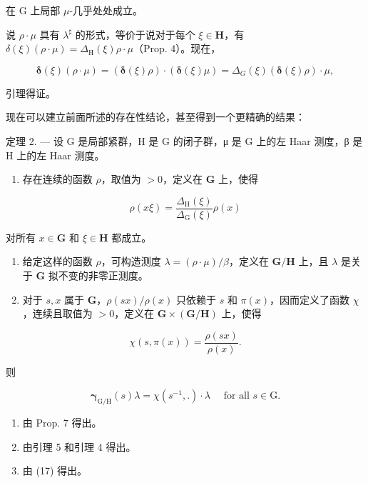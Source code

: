 在 G 上局部 \(\mu\)-几乎处处成立。

说 \(\rho \cdot \mu\) 具有 \(\lambda^{\sharp}\) 的形式，等价于说对于每个 \(\xi \in \mathbf{H}\)，有 \(\delta(\xi)(\rho \cdot \mu) = \Delta_{\mathrm{H}}(\xi)\rho \cdot \mu\)（Prop. 4）。现在，

\[
\boldsymbol {\delta} (\xi) (\rho \cdot \mu) = (\boldsymbol {\delta} (\xi) \rho) \cdot (\boldsymbol {\delta} (\xi) \mu) = \Delta_ {G} (\xi) (\boldsymbol {\delta} (\xi) \rho) \cdot \mu ,
\]

引理得证。

现在可以建立前面所述的存在性结论，甚至得到一个更精确的结果：

定理 2. --- 设 G 是局部紧群，H 是 G 的闭子群，μ 是 G 上的左 Haar 测度，β 是 H 上的左 Haar 测度。

\begin{enumerate}
\def\labelenumi{\alph{enumi})}
\tightlist
\item
  存在连续的函数 \(\rho\)，取值为 \(>0\)，定义在 \(\mathbf{G}\) 上，使得
\end{enumerate}

\[
\rho (x \xi) = \frac {\Delta_ {\mathrm{H}} (\xi)}{\Delta_ {\mathrm{G}} (\xi)} \rho (x)
\]

对所有 \(x \in \mathbf{G}\) 和 \(\xi \in \mathbf{H}\) 都成立。

\begin{enumerate}
\def\labelenumi{\alph{enumi})}
\setcounter{enumi}{1}
\item
  给定这样的函数 \(\rho\)，可构造测度 \(\lambda = (\rho \cdot \mu) / \beta\)，定义在 \(\mathbf{G} / \mathbf{H}\) 上，且 \(\lambda\) 是关于 \(\mathbf{G}\) 拟不变的非零正测度。
\item
  对于 \(s, x\) 属于 \(\mathbf{G}\)，\(\rho(sx) / \rho(x)\) 只依赖于 \(s\) 和 \(\pi(x)\)，因而定义了函数 \(\chi\)，连续且取值为 \(>0\)，定义在 \(\mathbf{G} \times (\mathbf{G} / \mathbf{H})\) 上，使得
\end{enumerate}

\[
\chi (s, \pi (x)) = \frac {\rho (s x)}{\rho (x)}.\tag{19}
\]

则

\[
\boldsymbol {\gamma} _ {\mathrm{G/H}} (s) \lambda = \chi (s ^ {- 1},.) \cdot \lambda \quad \text {   for   all   } s \in \mathrm{G}.\tag{20}
\]

\begin{enumerate}
\def\labelenumi{\alph{enumi})}
\item
  由 Prop. 7 得出。
\item
  由引理 5 和引理 4 得出。
\item
  由 (17) 得出。
\end{enumerate}

